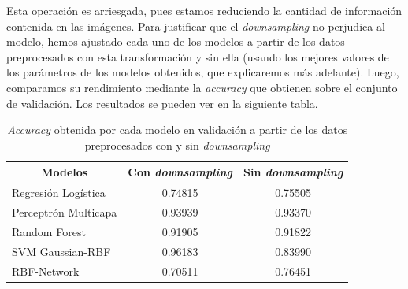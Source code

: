 \documentclass[a4]{article}
\begin{document}
\begin{figure}[H]
    \centering
	\label{fig:prep_downsampling}
\end{figure}


Esta operación es arriesgada, pues estamos reduciendo la cantidad de información contenida en las imágenes. Para justificar que el \textit{downsampling} no perjudica al modelo, hemos ajustado cada uno de los modelos a partir de los datos preprocesados con esta transformación y sin ella (usando los mejores valores de los parámetros de los modelos obtenidos, que explicaremos más adelante). Luego, comparamos su rendimiento mediante la \textit{accuracy} que obtienen sobre el conjunto de validación. Los resultados se pueden ver en la siguiente tabla.

\begin{table}[H]
	\centering
	\begin{tabular}{|l|c|c|}
    \hline
    \multicolumn{1}{|c|}{\textbf{Modelos}} & \textbf{Con \textit{downsampling}} & \textbf{Sin \textit{downsampling}} \\ \hline
    Regresión Logística                    & 0.74815                & 0.75505                   \\ \hline
    Perceptrón Multicapa                   & 0.93939                & 0.93370                   \\ \hline
    Random Forest                          & 0.91905                & 0.91822                   \\ \hline
    SVM Gaussian-RBF                       & 0.96183                & 0.83990                   \\ \hline
    RBF-Network                            & 0.70511                & 0.76451                \\ \hline
    \end{tabular}
	\caption{\textit{Accuracy} obtenida por cada modelo en validación a partir de los datos preprocesados con y sin \textit{downsampling}}
	\label{table:downsampling}
\end{table}
\end{document}
